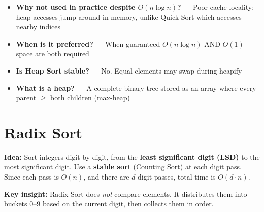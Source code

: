 \documentclass[12pt,a4paper,oneside]{book}
\begin{document}
\begin{interviewcorner}
\begin{itemize}
  \item \textbf{Why not used in practice despite $O(n \log n)$?} --- Poor cache locality; heap accesses jump around in memory, unlike Quick Sort which accesses nearby indices
  \item \textbf{When is it preferred?} --- When guaranteed $O(n \log n)$ AND $O(1)$ space are both required
  \item \textbf{Is Heap Sort stable?} --- No. Equal elements may swap during heapify
  \item \textbf{What is a heap?} --- A complete binary tree stored as an array where every parent $\geq$ both children (max-heap)
\end{itemize}
\end{interviewcorner}

\section{Radix Sort}

\textbf{Idea:} Sort integers digit by digit, from the \textbf{least significant digit (LSD)} to the most significant digit. Use a \textbf{stable sort} (Counting Sort) at each digit pass. Since each pass is $O(n)$, and there are $d$ digit passes, total time is $O(d \cdot n)$.

\textbf{Key insight:} Radix Sort does \textit{not} compare elements. It distributes them into buckets 0--9 based on the current digit, then collects them in order.
\end{document}
